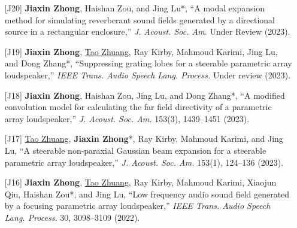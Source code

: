 \documentclass[10pt,a4paper,ragged2e,withhyper]{altacv}
\newcommand{\PubJournal}[1]{\textit{#1}}
\newcommand{\PubTitle}[1]{``{#1,}''}
\newcommand{\PubCorAuthor}[1]{#1*}
\newcommand{\PubMe}[1]{\textbf{#1}}
\begin{document}
\begin{itemize}[leftmargin = 30pt]
    \justifying 
    \item[{[J20]}]
        \PubMe{Jiaxin Zhong}, Haishan Zou, and \PubCorAuthor{Jing Lu},
        \PubTitle{A modal expansion method for simulating reverberant sound fields generated by a directional source in a rectangular enclosure}
        \PubJournal{J. Acoust. Soc. Am.} 
        Under Review (2023).
    \item[{[J19]}]
        \PubMe{Jiaxin Zhong}, \underline{Tao Zhuang}, Ray Kirby, Mahmoud Karimi, Jing Lu, and \PubCorAuthor{Dong Zhang},
        \PubTitle{Suppressing grating lobes for a steerable parametric array loudspeaker}
        \PubJournal{IEEE Trans. Audio Speech Lang. Process.}
        Under review (2023).
        
    \item[{[J18]}]
        \PubMe{Jiaxin Zhong}, Haishan Zou, Jing Lu, and \PubCorAuthor{Dong Zhang},
        \PubTitle{A modified convolution model for calculating the far field directivity of a parametric array loudspeaker}
        \PubJournal{J. Acoust. Soc. Am.}
        153(3), 1439--1451 (2023).
        \href{https://doi.org/10.1121/10.0017361}{\color{accent}\aiDoi}
        \href{https://github.com/JiaxinZhong/JiaxinZhong.github.io/raw/master/publications/journal/Zhuang2023-JASA-PAL_steerable_GBE.pdf}{\color{accent}\faFilePdf[regular]}


    \item[{[J17]}]
        \underline{Tao Zhuang}, 
        \PubCorAuthor{\PubMe{Jiaxin Zhong}},
        Ray Kirby, Mahmoud Karimi, and Jing Lu, 
        \PubTitle{A steerable non-paraxial Gaussian beam expansion for a steerable parametric array loudspeaker}
        \PubJournal{J. Acoust. Soc. Am.}
        153(1), 124--136 (2023).
        \href{https://doi.org/10.1121/10.0016816}{\color{accent}\aiDoi}
        \href{https://github.com/JiaxinZhong/JiaxinZhong.github.io/raw/master/publications/journal/Zhuang2023-JASA-PAL_steerable_GBE.pdf}{\color{accent}\faFilePdf[regular]}

    \item[{[J16]}]
        \PubMe{Jiaxin Zhong}, \underline{Tao Zhuang}, Ray Kirby, Mahmoud Karimi, Xiaojun Qiu, \PubCorAuthor{Haishan Zou}, and Jing Lu,
        \PubTitle{Low frequency audio sound field generated by a focusing parametric array loudspeaker}
        \PubJournal{IEEE Trans. Audio Speech Lang. Process.}
        30, 3098--3109 (2022).
        \href{https://doi.org/10.1109/TASLP.2022.3209944}{\color{accent}\aiDoi}
        \href{https://github.com/JiaxinZhong/JiaxinZhong.github.io/raw/master/publications/journal/Zhong2022-IEEETASLP-Focusing_PAL.pdf}{\color{accent}\faFilePdf[regular]}


\end{itemize}
\end{document}
